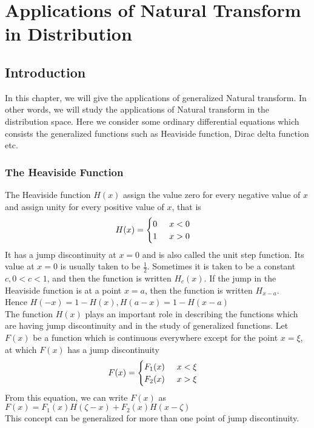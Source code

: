 
\chapter{Applications of Natural Transform in Distribution}


\maketitle

\section{Introduction}
In this chapter, we will give the applications of generalized Natural transform. In other words, we will study the applications of Natural transform in the distribution space. Here we consider some ordinary differential equations which consists the generalized functions such as Heaviside function, Dirac delta function etc.
\subsection{The Heaviside Function}
The Heaviside function $ H(x) $ assign the value zero for every negative value of $x$ and assign unity for every positive value of $x$, that is
\begin{align*}
   H(x) = \begin{cases}
  0\hspace{0.5cm}  x<0 \\
  1\hspace{0.5cm}  x>0
  \end{cases}
 \end{align*}
It has a jump discontinuity at $x = 0$ and is also called the unit step function. Its value at $x = 0$ is usually taken to be $ \frac{1}{2} $. Sometimes it is taken to be a constant $ c,0< c < 1 $, and then the function is written $H_{c}(x)$. If the jump in the Heaviside function is at a point $x = a$, then the function is written $H_{x-a}$.\\
Hence $ H(-x)=1-H(x),H(a-x)=1-H(x-a)$\\
The function $H (x)$ plays an important role in describing the functions which are having jump discontinuity and in the study of generalized functions. Let $F(x)$ be a function which is continuous everywhere except for the point $x =\xi$, at which $F(x)$ has a jump discontinuity
\begin{align*}
  F(x) = \begin{cases}
 F_{1}(x)\hspace{0.5cm}  x<\xi \\
 F_{2}(x)\hspace{0.5cm}  x>\xi
  \end{cases}
 \end{align*}
From this equation, we can write $ F(x) $ as\\
$ F(x)=F_{1}(x)H(\zeta-x)+F_{2}(x)H(x-\zeta)$\\
This concept can be generalized for more than one point of jump discontinuity.

